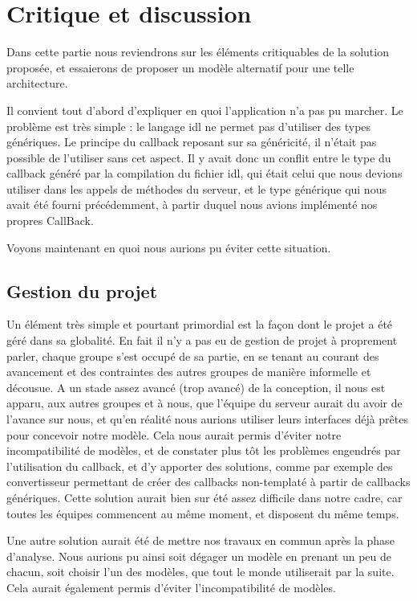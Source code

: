 \documentclass[a4paper, french, 11pt]{report}
\begin{document}
\chapter{Critique et discussion}

\minitoc

Dans cette partie nous reviendrons sur les éléments critiquables de la solution proposée, et essaierons de proposer un modèle alternatif pour une telle architecture.

Il convient tout d'abord d'expliquer en quoi l'application n'a pas pu marcher. Le problème est très simple : le langage idl ne permet pas d'utiliser des types génériques. Le principe du callback reposant sur sa généricité, il n'était pas possible de l'utiliser sans cet aspect. Il y avait donc un conflit entre le type du callback généré par la compilation du fichier idl, qui était celui que nous devions utiliser dans les appels de méthodes du serveur, et le type générique qui nous avait été fourni précédemment, à partir duquel nous avions implémenté nos propres CallBack.

Voyons maintenant en quoi nous aurions pu éviter cette situation.

\section{Gestion du projet}
Un élément très simple et pourtant primordial est la façon dont le projet a été géré dans sa globalité. En fait il n'y a pas eu de gestion de projet à proprement parler, chaque groupe s'est occupé de sa partie, en se tenant au courant des avancement et des contraintes des autres groupes de manière informelle et décousue. A un stade assez avancé (trop avancé) de la conception, il nous est apparu, aux autres groupes et à nous, que l'équipe du serveur aurait du avoir de l'avance sur nous, et qu'en réalité nous aurions utiliser leurs interfaces déjà prêtes pour concevoir notre modèle. Cela nous aurait permis d'éviter notre incompatibilité de modèles, et de constater plus tôt les problèmes engendrés par l'utilisation du callback, et d'y apporter des solutions, comme par exemple des convertisseur permettant de créer des callbacks non-templaté à partir de callbacks génériques. Cette solution aurait bien sur été assez difficile dans notre cadre, car toutes les équipes commencent au même moment, et disposent du même temps.

Une autre solution aurait été de mettre nos travaux en commun après la phase d'analyse. Nous aurions pu ainsi soit dégager un modèle en prenant un peu de chacun, soit choisir l'un des modèles, que tout le monde utiliserait par la suite. Cela aurait également permis d'éviter l'incompatibilité de modèles.
\end{document}
